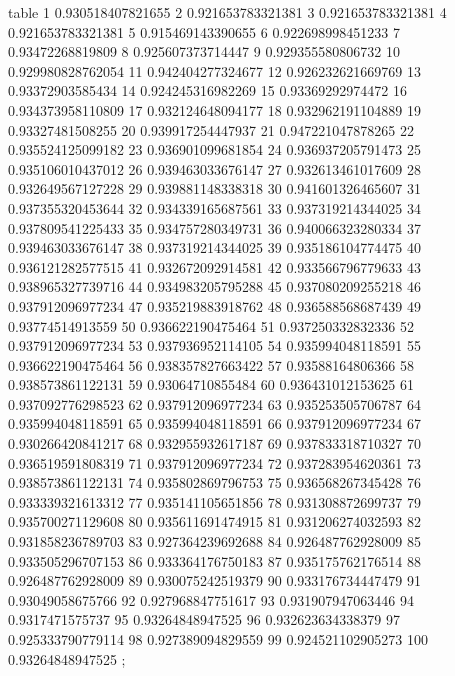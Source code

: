 table {%
	1 0.930518407821655
	2 0.921653783321381
	3 0.921653783321381
	4 0.921653783321381
	5 0.915469143390655
	6 0.922698998451233
	7 0.93472268819809
	8 0.925607373714447
	9 0.929355580806732
	10 0.929980828762054
	11 0.942404277324677
	12 0.926232621669769
	13 0.93372903585434
	14 0.924245316982269
	15 0.93369292974472
	16 0.934373958110809
	17 0.932124648094177
	18 0.932962191104889
	19 0.93327481508255
	20 0.939917254447937
	21 0.947221047878265
	22 0.935524125099182
	23 0.936901099681854
	24 0.936937205791473
	25 0.935106010437012
	26 0.939463033676147
	27 0.932613461017609
	28 0.932649567127228
	29 0.939881148338318
	30 0.941601326465607
	31 0.937355320453644
	32 0.934339165687561
	33 0.937319214344025
	34 0.937809541225433
	35 0.934757280349731
	36 0.940066323280334
	37 0.939463033676147
	38 0.937319214344025
	39 0.935186104774475
	40 0.936121282577515
	41 0.932672092914581
	42 0.933566796779633
	43 0.938965327739716
	44 0.934983205795288
	45 0.937080209255218
	46 0.937912096977234
	47 0.935219883918762
	48 0.936588568687439
	49 0.93774514913559
	50 0.936622190475464
	51 0.937250332832336
	52 0.937912096977234
	53 0.937936952114105
	54 0.935994048118591
	55 0.936622190475464
	56 0.938357827663422
	57 0.93588164806366
	58 0.938573861122131
	59 0.93064710855484
	60 0.936431012153625
	61 0.937092776298523
	62 0.937912096977234
	63 0.935253505706787
	64 0.935994048118591
	65 0.935994048118591
	66 0.937912096977234
	67 0.930266420841217
	68 0.932955932617187
	69 0.937833318710327
	70 0.936519591808319
	71 0.937912096977234
	72 0.937283954620361
	73 0.938573861122131
	74 0.935802869796753
	75 0.936568267345428
	76 0.933339321613312
	77 0.935141105651856
	78 0.931308872699737
	79 0.935700271129608
	80 0.935611691474915
	81 0.931206274032593
	82 0.931858236789703
	83 0.927364239692688
	84 0.926487762928009
	85 0.933505296707153
	86 0.933364176750183
	87 0.935175762176514
	88 0.926487762928009
	89 0.930075242519379
	90 0.933176734447479
	91 0.93049058675766
	92 0.927968847751617
	93 0.931907947063446
	94 0.9317471575737
	95 0.93264848947525
	96 0.932623634338379
	97 0.925333790779114
	98 0.927389094829559
	99 0.924521102905273
	100 0.93264848947525
};
